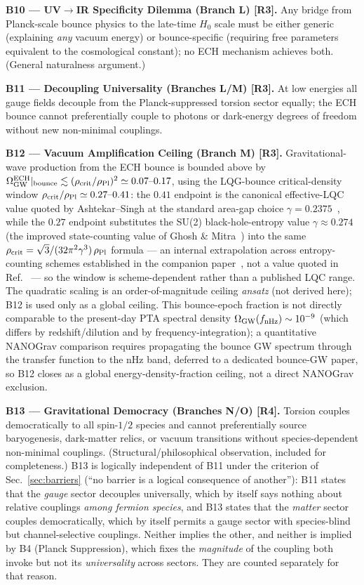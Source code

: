 \documentclass[aps,prd,twocolumn,superscriptaddress,showpacs,preprintnumbers,nofootinbib,longbibliography,floatfix]{revtex4-2}
\newcommand{\rhocrit}{\rho_{\rm crit}}
\newcommand{\rhoPl}{\rho_{\rm Pl}}
\begin{document}
\medskip\noindent\textbf{B10 --- UV$\to$IR Specificity Dilemma (Branch L) [R3].} Any bridge from
Planck-scale bounce physics to the late-time $H_0$ scale must be either generic
(explaining \emph{any} vacuum energy) or bounce-specific (requiring free
parameters equivalent to the cosmological constant); no ECH mechanism achieves
both. (General naturalness argument.)

\medskip\noindent\textbf{B11 --- Decoupling Universality (Branches L/M) [R3].} At low energies all
gauge fields decouple from the Planck-suppressed torsion sector equally; the ECH
bounce cannot preferentially couple to photons or dark-energy degrees of freedom
without new non-minimal couplings.

\medskip\noindent\textbf{B12 --- Vacuum Amplification Ceiling (Branch M) [R3].} Gravitational-wave
production from the ECH bounce is bounded above by
$\Omega_{\rm GW}^{\rm ECH}|_{\rm bounce} \lesssim (\rhocrit/\rhoPl)^2 \simeq
0.07\text{--}0.17$, using the LQG-bounce critical-density window
$\rhocrit/\rhoPl \simeq 0.27\text{--}0.41$: the $0.41$ endpoint is the
canonical effective-LQC value quoted by Ashtekar--Singh at the standard
area-gap choice $\gamma=0.2375$~\cite{Ashtekar2011}, while the $0.27$
endpoint substitutes the SU(2) black-hole-entropy value
$\gamma\approx0.274$ (the improved state-counting value of Ghosh \&
Mitra~\cite{GhoshMitra2005}) into the same
$\rhocrit=\sqrt{3}/(32\pi^2\gamma^3)\,\rhoPl$ formula --- an internal
extrapolation across entropy-counting schemes established in the
companion paper~\cite{Golden2026P1a}, not a value quoted in
Ref.~\cite{Ashtekar2011} --- so the window is scheme-dependent rather
than a published LQC range. The quadratic scaling is an order-of-magnitude
ceiling \emph{ansatz} (not derived here); B12 is used only as a global ceiling.
This bounce-epoch fraction is not directly comparable to the present-day PTA
spectral density $\Omega_{\rm GW}(f_{\rm nHz}) \sim 10^{-9}$ (which differs by
redshift/dilution and by frequency-integration); a quantitative NANOGrav
comparison requires propagating the bounce GW spectrum through the transfer
function to the nHz band, deferred to a dedicated bounce-GW paper, so B12 closes
as a global energy-density-fraction ceiling, not a direct NANOGrav exclusion.

\medskip\noindent\textbf{B13 --- Gravitational Democracy (Branches N/O) [R4].} Torsion couples
democratically to all spin-$1/2$ species and cannot preferentially source
baryogenesis, dark-matter relics, or vacuum transitions without
species-dependent non-minimal couplings. (Structural/philosophical observation,
included for completeness.) B13 is logically independent of B11 under the
criterion of Sec.~\ref{sec:barriers} (``no barrier is a logical
consequence of another''): B11 states that the \emph{gauge} sector
decouples universally, which by itself says nothing about relative
couplings \emph{among fermion species}, and B13 states that the
\emph{matter} sector couples democratically, which by itself permits a
gauge sector with species-blind but channel-selective couplings. Neither
implies the other, and neither is implied by B4 (Planck Suppression),
which fixes the \emph{magnitude} of the coupling both invoke but not its
\emph{universality} across sectors. They are counted separately for that
reason.
\end{document}
